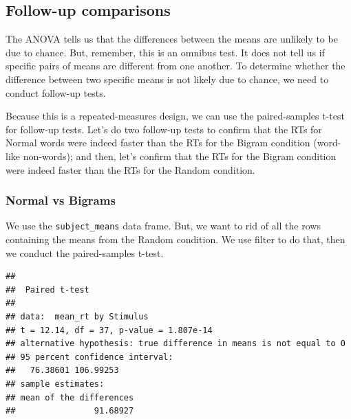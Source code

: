 \documentclass[]{book}
\newenvironment{Shaded}{\begin{snugshade}}{\end{snugshade}}
\newcommand{\KeywordTok}[1]{\textcolor[rgb]{0.13,0.29,0.53}{\textbf{{#1}}}}
\newcommand{\DataTypeTok}[1]{\textcolor[rgb]{0.13,0.29,0.53}{{#1}}}
\newcommand{\StringTok}[1]{\textcolor[rgb]{0.31,0.60,0.02}{{#1}}}
\newcommand{\OtherTok}[1]{\textcolor[rgb]{0.56,0.35,0.01}{{#1}}}
\newcommand{\NormalTok}[1]{{#1}}
\theoremstyle{definition}
\theoremstyle{definition}
\theoremstyle{definition}
\theoremstyle{remark}
\begin{document}
\subsection{Follow-up comparisons}\label{follow-up-comparisons}

The ANOVA tells us that the differences between the means are unlikely
to be due to chance. But, remember, this is an omnibus test. It does not
tell us if specific pairs of means are different from one another. To
determine whether the difference between two specific means is not
likely due to chance, we need to conduct follow-up tests.

Because this is a repeated-measures design, we can use the
paired-samples t-test for follow-up tests. Let's do two follow-up tests
to confirm that the RTs for Normal words were indeed faster than the RTs
for the Bigram condition (word-like non-words); and then, let's confirm
that the RTs for the Bigram condition were indeed faster than the RTs
for the Random condition.

\subsubsection{Normal vs Bigrams}\label{normal-vs-bigrams}

We use the \texttt{subject\_means} data frame. But, we want to rid of
all the rows containing the means from the Random condition. We use
filter to do that, then we conduct the paired-samples t-test.

\begin{Shaded}
\end{Shaded}

\begin{verbatim}
## 
##  Paired t-test
## 
## data:  mean_rt by Stimulus
## t = 12.14, df = 37, p-value = 1.807e-14
## alternative hypothesis: true difference in means is not equal to 0
## 95 percent confidence interval:
##   76.38601 106.99253
## sample estimates:
## mean of the differences 
##                91.68927
\end{verbatim}
\end{document}

